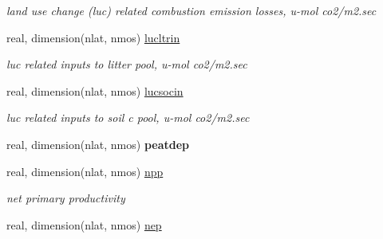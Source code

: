 \begin{DoxyCompactItemize}
\begin{DoxyCompactList}\small\item\em land use change (luc) related combustion emission losses, u-\/mol co2/m2.\+sec \end{DoxyCompactList}\item 
\hypertarget{structctem__statevars_1_1veg__rot_ad6b7cab2f6af48ae399dee3e722eab6b}{}real, dimension(nlat, nmos) \hyperlink{structctem__statevars_1_1veg__rot_ad6b7cab2f6af48ae399dee3e722eab6b}{lucltrin}\label{structctem__statevars_1_1veg__rot_ad6b7cab2f6af48ae399dee3e722eab6b}

\begin{DoxyCompactList}\small\item\em luc related inputs to litter pool, u-\/mol co2/m2.\+sec \end{DoxyCompactList}\item 
\hypertarget{structctem__statevars_1_1veg__rot_a3607609cc4766b58b177306d4130c849}{}real, dimension(nlat, nmos) \hyperlink{structctem__statevars_1_1veg__rot_a3607609cc4766b58b177306d4130c849}{lucsocin}\label{structctem__statevars_1_1veg__rot_a3607609cc4766b58b177306d4130c849}

\begin{DoxyCompactList}\small\item\em luc related inputs to soil c pool, u-\/mol co2/m2.\+sec \end{DoxyCompactList}\item 
\hypertarget{structctem__statevars_1_1veg__rot_af28f0440f19a7475b5f0c361d4af2752}{}real, dimension(nlat, nmos) {\bfseries peatdep}\label{structctem__statevars_1_1veg__rot_af28f0440f19a7475b5f0c361d4af2752}

\item 
\hypertarget{structctem__statevars_1_1veg__rot_a25b7905aae5d130f67504f5299b3a207}{}real, dimension(nlat, nmos) \hyperlink{structctem__statevars_1_1veg__rot_a25b7905aae5d130f67504f5299b3a207}{npp}\label{structctem__statevars_1_1veg__rot_a25b7905aae5d130f67504f5299b3a207}

\begin{DoxyCompactList}\small\item\em net primary productivity \end{DoxyCompactList}\item 
\hypertarget{structctem__statevars_1_1veg__rot_a41749e18889a236c3e0874501f4e33ca}{}real, dimension(nlat, nmos) \hyperlink{structctem__statevars_1_1veg__rot_a41749e18889a236c3e0874501f4e33ca}{nep}\label{structctem__statevars_1_1veg__rot_a41749e18889a236c3e0874501f4e33ca}


\end{DoxyCompactItemize}
